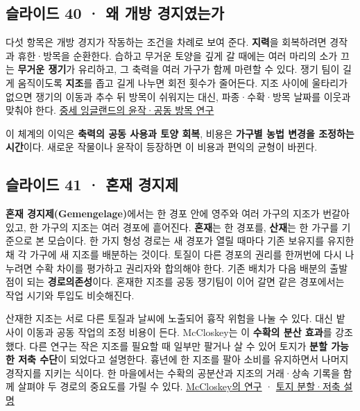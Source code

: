 \documentclass[10pt,a4paper]{article}
\begin{document}
\subsection{슬라이드 40 · 왜 개방 경지였는가}
다섯 항목은 개방 경지가 작동하는 조건을 차례로 보여 준다. \textbf{지력}을 회복하려면 경작과 휴한·방목을 순환한다. 습하고 무거운 토양을 깊게 갈 때에는 여러 마리의 소가 끄는 \textbf{무거운 쟁기}가 유리하고, 그 축력을 여러 가구가 함께 마련할 수 있다. 쟁기 팀이 길게 움직이도록 \textbf{지조}를 좁고 길게 나누면 회전 횟수가 줄어든다. 지조 사이에 울타리가 없으면 쟁기의 이동과 추수 뒤 방목이 쉬워지는 대신, 파종·수확·방목 날짜를 이웃과 맞춰야 한다. \href{https://academic.oup.com/book/61548/chapter/537298429}{중세 잉글랜드의 윤작·공동 방목 연구}\par

이 체계의 이익은 \textbf{축력의 공동 사용과 토양 회복}, 비용은 \textbf{가구별 농법 변경을 조정하는 시간}이다. 새로운 작물이나 윤작이 등장하면 이 비용과 편익의 균형이 바뀐다.\par

\subsection{슬라이드 41 · 혼재 경지제}
\textbf{혼재 경지제(Gemengelage)}에서는 한 경포 안에 영주와 여러 가구의 지조가 번갈아 있고, 한 가구의 지조는 여러 경포에 흩어진다. \textbf{혼재}는 한 경포를, \textbf{산재}는 한 가구를 기준으로 본 모습이다. 한 가지 형성 경로는 새 경포가 열릴 때마다 기존 보유지를 유지한 채 각 가구에 새 지조를 배분하는 것이다. 토질이 다른 경포의 권리를 한꺼번에 다시 나누려면 수확 차이를 평가하고 권리자와 합의해야 한다. 기존 배치가 다음 배분의 출발점이 되는 \textbf{경로의존성}이다. 혼재한 지조를 공동 쟁기팀이 이어 갈면 같은 경포에서는 작업 시기와 투입도 비슷해진다.\par

산재한 지조는 서로 다른 토질과 날씨에 노출되어 흉작 위험을 나눌 수 있다. 대신 밭 사이 이동과 공동 작업의 조정 비용이 든다. McCloskey는 이 \textbf{수확의 분산 효과}를 강조했다. 다른 연구는 작은 지조를 필요할 때 일부만 팔거나 살 수 있어 토지가 \textbf{분할 가능한 저축 수단}이 되었다고 설명한다. 흉년에 한 지조를 팔아 소비를 유지하면서 나머지 경작지를 지키는 식이다. 한 마을에서는 수확의 공분산과 지조의 거래·상속 기록을 함께 살펴야 두 경로의 중요도를 가릴 수 있다. \href{https://deirdremccloskey.org/docs/pdf/Article\_50.pdf}{McCloskey의 연구} · \href{https://www.sciencedirect.com/science/article/abs/pii/S0014498303000305}{토지 분할·저축 설명}\par
\end{document}
